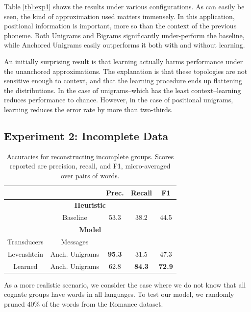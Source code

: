 \documentclass[11pt,a4paper]{article}
\begin{document}
Table \ref{tbl:exp1} shows the results under various configurations.
As can easily be seen, the kind of approximation used matters
immensely. In this application, positional information is important,
more so than the context of the previous phoneme. Both Unigrams and
Bigrams significantly under-perform the baseline, while Anchored
Unigrams easily outperforms it both with and without learning.

An initially surprising result is that learning actually harms
performance under the unanchored approximations. The explanation
is that these topologies are not sensitive enough to context, and
that the learning procedure ends up flattening the distributions.
In the case of unigrams--which has the least context--learning
reduces performance to chance. However, in the case of positional
unigrams, learning reduces the error rate by more than two-thirds.

\subsection{Experiment 2: Incomplete Data}

\begin{table}
  \small
  { 
  \begin{tabular}{|c|c|c|c|c|}
    \cline{3-5} 
    \multicolumn{2}{c|}{\textbf{}} & Prec. & Recall & F1 \\
    \hline 
    \multicolumn{5}{|c|}{\textbf{Heuristic}} \\
    \hline
    \multicolumn{1}{|c}{} & \multicolumn{1}{c|}{Baseline} & 53.3 & 38.2 & 44.5  \\
    \hline
    \hline
    \multicolumn{5}{|c|}{\textbf{Model}} \\
    \hline
    Transducers & Messages & \multicolumn{2}{c}{} \\
    \hline
    Levenshtein&Anch. Unigrams & \textbf{95.3} & 31.5 & 47.3\\
    Learned&Anch. Unigrams  & 62.8 & \textbf{84.3} & \textbf{72.9} \\
    \hline
  \end{tabular}
  \caption{Accuracies for reconstructing incomplete groups. Scores
  reported are precision, recall, and F1, micro-averaged over pairs of words.}
  \label{tbl:partial}
 }
\end{table}

As a more realistic scenario, we consider the case where we do not
know that all cognate groups have words in all languages. To test
our model, we randomly pruned 40\% of the words from the Romance
dataset.
\end{document}
